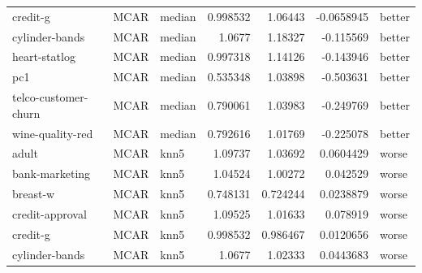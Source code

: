 \begin{table}[ht]
\begin{tabular}{lllrrrl}
 credit-g             & MCAR        & median           &                                 0.998532 &                             1.06443  &                    -0.0658945  & better               \\
 cylinder-bands       & MCAR        & median           &                                 1.0677   &                             1.18327  &                    -0.115569   & better               \\
 heart-statlog        & MCAR        & median           &                                 0.997318 &                             1.14126  &                    -0.143946   & better               \\
 pc1                  & MCAR        & median           &                                 0.535348 &                             1.03898  &                    -0.503631   & better               \\
 telco-customer-churn & MCAR        & median           &                                 0.790061 &                             1.03983  &                    -0.249769   & better               \\
 wine-quality-red     & MCAR        & median           &                                 0.792616 &                             1.01769  &                    -0.225078   & better               \\
 adult                & MCAR        & knn5             &                                 1.09737  &                             1.03692  &                     0.0604429  & worse                \\
 bank-marketing       & MCAR        & knn5             &                                 1.04524  &                             1.00272  &                     0.042529   & worse                \\
 breast-w             & MCAR        & knn5             &                                 0.748131 &                             0.724244 &                     0.0238879  & worse                \\
 credit-approval      & MCAR        & knn5             &                                 1.09525  &                             1.01633  &                     0.078919   & worse                \\
 credit-g             & MCAR        & knn5             &                                 0.998532 &                             0.986467 &                     0.0120656  & worse                \\
 cylinder-bands       & MCAR        & knn5             &                                 1.0677   &                             1.02333  &                     0.0443683  & worse                \\

\end{tabular}
\end{table}
